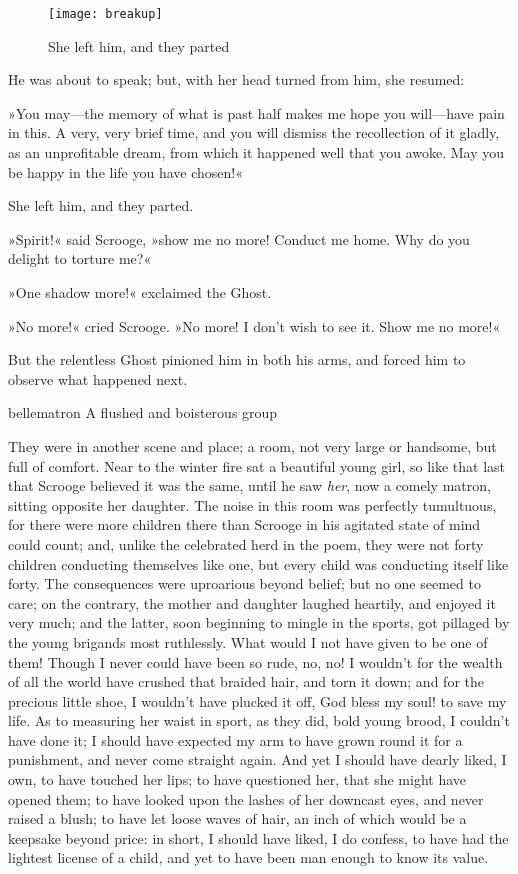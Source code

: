 \begin{figure}[tb]
\centering
\texttt{[image: breakup]}
\caption{She left him, and they parted}
\end{figure}

He was about to speak; but, with her head turned from him, she resumed:

»You may---the memory of what is past half makes me hope you will---have pain in this. A very, very brief time, and you will dismiss the recollection of it gladly, as an unprofitable dream, from which it happened well that you awoke. May you be happy in the life you have chosen!«

She left him, and they parted.

»Spirit!« said Scrooge, »show me no more! Conduct me home. Why do you delight to torture me?«

»One shadow more!« exclaimed the Ghost.

»No more!« cried Scrooge. »No more! I don't wish to see it. Show me no more!«

But the relentless Ghost pinioned him in both his arms, and forced him to observe what happened next.

\begin{colorbigpic}
	[\bigpicsize]
	{bellematron}
	{A flushed and boisterous group}
\end{colorbigpic}


They were in another scene and place; a room, not very large or handsome, but full of comfort. Near to the winter fire sat a beautiful young girl, so like that last that Scrooge believed it was the same, until he saw \textit{her}, now a comely matron, sitting opposite her daughter. The noise in this room was perfectly tumultuous, for there were more children there than Scrooge in his agitated state of mind could count; and, unlike the celebrated herd in the poem, they were not forty children conducting themselves like one, but every child was conducting itself like forty. The consequences were uproarious beyond belief; but no one seemed to care; on the contrary, the mother and daughter laughed heartily, and enjoyed it very much; and the latter, soon beginning to mingle in the sports, got pillaged by the young brigands most ruthlessly. What would I not have given to be one of them! Though I never could have been so rude, no, no! I wouldn't for the wealth of all the world have crushed that braided hair, and torn it down; and for the precious little shoe, I wouldn't have plucked it off, God bless my soul! to save my life. As to measuring her waist in sport, as they did, bold young brood, I couldn't have done it; I should have expected my arm to have grown round it for a punishment, and never come straight again. And yet I should have dearly liked, I own, to have touched her lips; to have questioned her, that she might have opened them; to have looked upon the lashes of her downcast eyes, and never raised a blush; to have let loose waves of hair, an inch of which would be a keepsake beyond price: in short, I should have liked, I do confess, to have had the lightest license of a child, and yet to have been man enough to know its value.

